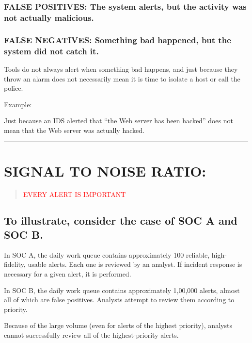 \documentclass[10pt,british,english]{article}
\begin{document}
\subsubsection{FALSE POSITIVES: The system alerts, but the activity was not actually
malicious.}

\subsubsection{FALSE NEGATIVES: Something bad happened, but the system did not catch
it.}

Tools do not always alert when something bad happens, and just because
they throw an alarm does not necessarily mean it is time to isolate
a host or call the police. 

Example:

Just because an IDS alerted that \textquotedblleft the Web server
has been hacked\textquotedblright{} does not mean that the Web server
was actually hacked.

\rule[0.5ex]{1\columnwidth}{1pt}

\section{SIGNAL TO NOISE RATIO: }
\begin{quotation}
\noindent \begin{center}
\textcolor{red}{\LARGE{}EVERY ALERT IS IMPORTANT}{\LARGE\par}
\par\end{center}
\end{quotation}

\subsection{To illustrate, consider the case of SOC A and SOC B. }

In SOC A, the daily work queue contains approximately 100 reliable,
high-fidelity, usable alerts. Each one is reviewed by an analyst.
If incident response is necessary for a given alert, it is performed.

In SOC B, the daily work queue contains approximately 1,00,000 alerts,
almost all of which are false positives. Analysts attempt to review
them according to priority. 

Because of the large volume (even for alerts of the highest priority),
analysts cannot successfully review all of the highest-priority alerts. 
\end{document}
